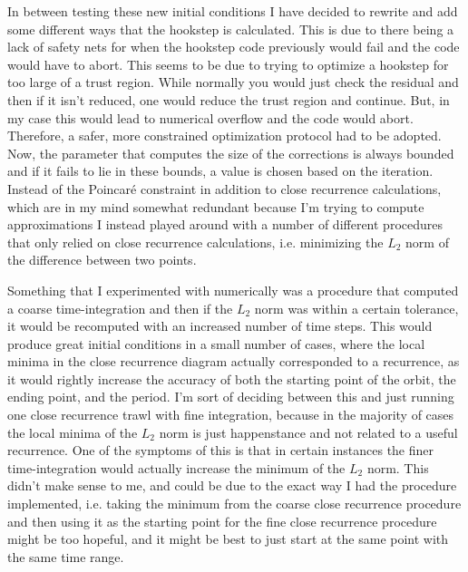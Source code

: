 In between testing these new initial conditions I have decided to rewrite
and add some different ways that the hookstep is calculated. This is due
to there being a lack of safety nets for when the hookstep code
previously would fail and the code would have to abort. This seems to be
due to trying to optimize a hookstep for too large of a trust region.
While normally you would just check the residual and then if it isn't
reduced, one would reduce the trust region and continue. But, in my case
this would lead to numerical overflow and the code would abort.
Therefore, a safer, more constrained optimization protocol had to be
adopted. Now, the parameter that computes the size of the corrections is
always bounded and if it fails to lie in these bounds, a value is chosen
based on the iteration.
Instead of the Poincar\'e constraint in addition to close recurrence calculations, which
are in my mind somewhat redundant because I'm trying to compute approximations I instead
played around with a number of different procedures that only relied on close recurrence
calculations, i.e. minimizing the $L_2$ norm of the difference between two {\statesp} points.

Something that I experimented with numerically was a procedure that computed a coarse time-integration
and then if the $L_2$ norm was within a certain tolerance, it would be recomputed with an increased number
of time steps. This would produce great initial conditions in a small number of cases, where the local minima in the
close recurrence diagram actually corresponded to a recurrence, as it would rightly increase the accuracy of both
the starting point of the orbit, the ending point, and the period. I'm sort of deciding between this
and just running one close recurrence trawl with fine integration, because in the majority of cases the
local minima of the $L_2$ norm is just happenstance and not related to a useful recurrence. One of the
symptoms of this is that in certain instances the finer time-integration would actually increase
the minimum of the $L_2$ norm. This didn't make sense to me, and could be due to the exact way I had the
procedure implemented, i.e. taking the minimum from the coarse close recurrence procedure and then
using it as the starting point for the fine close recurrence procedure might be too hopeful, and it might
be best to just start at the same point with the same time range.

